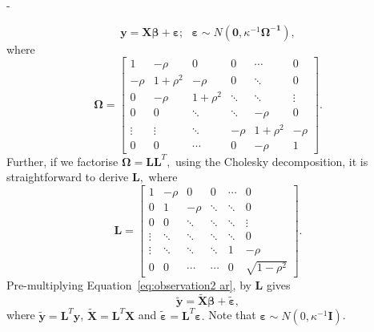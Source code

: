 -\documentclass[article]{jss}
\begin{document}
\begin{equation}
  \bm{y}=\bm{X}\bm{\beta}+\bm{\varepsilon};\,\,\,\,\bm{\varepsilon}\sim N\left(\bm{0},\kappa^{-1}\bm{\Omega^{-1}}\right),\label{eq:observation2 ar}\end{equation}
where \[
\bm{\Omega}=\left[\begin{array}{cccccc}
    1 & -\rho & 0 & 0 & \cdots & 0\\
    -\rho & 1+\rho^{2} & -\rho & 0 & \ddots & 0\\
    0 & -\rho & 1+\rho^{2} & \ddots & \ddots & \vdots\\
    0 & 0 & \ddots & \ddots & -\rho & 0\\
    \vdots & \vdots & \ddots & -\rho & 1+\rho^{2} & -\rho\\
    0 & 0 & \cdots & 0 & -\rho & 1\end{array}\right].\]
Further, if we factorise $\bm{\Omega}=\bm{L}\bm{L}^{T},$ using the
Cholesky decomposition, it is straightforward to derive $\bm{L},$
where\[
\bm{L}=\left[\begin{array}{cccccc}
    1 & -\rho & 0 & 0 & \cdots & 0\\
    0 & 1 & -\rho & \ddots & \ddots & 0\\
    0 & 0 & \ddots & \ddots & \ddots & \vdots\\
    \vdots & \ddots & \ddots & \ddots & \ddots & 0\\
    \vdots & \ddots & \ddots & \ddots & 1 & -\rho\\
    0 & 0 & \cdots & \cdots & 0 & \sqrt{1-\rho^{2}}\end{array}\right].\]
Pre-multiplying Equation~\ref{eq:observation2 ar}, by $\bm{L}$ gives\begin{equation}
  \bm{\tilde{y}}=\bm{\tilde{X}}\bm{\beta}+\bm{\tilde{\varepsilon}},\label{eq:trans_obs_ar}\end{equation}
where $\bm{\tilde{y}}=\bm{L}^{T}\bm{y}$, $\bm{\tilde{X}}=\bm{L}^{T}\bm{X}$
and $\tilde{\bm{\varepsilon}}=\bm{L}^{T}\bm{\varepsilon}.$ Note that
$\bm{\varepsilon}\sim N(0,\kappa^{-1}\bm{I})$.
\end{document}

